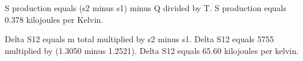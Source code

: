 S production equals (s2 minus s1) minus Q divided by T.  
S production equals 0.378 kilojoules per Kelvin.

Delta S12 equals m total multiplied by s2 minus s1.  
Delta S12 equals 5755 multiplied by (1.3050 minus 1.2521).  
Delta S12 equals 65.60 kilojoules per kelvin.